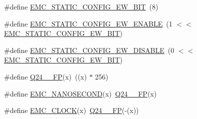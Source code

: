 \begin{DoxyCompactItemize}
\item 
\#define \hyperlink{group___e_m_c__18_x_x__43_x_x_ga370c463c17112a5a74f226c55c94f9b4}{E\+M\+C\+\_\+\+S\+T\+A\+T\+I\+C\+\_\+\+C\+O\+N\+F\+I\+G\+\_\+\+E\+W\+\_\+\+B\+IT}~(8)
\item 
\#define \hyperlink{group___e_m_c__18_x_x__43_x_x_ga91f57a23487235910d9a65c7e25c74e9}{E\+M\+C\+\_\+\+S\+T\+A\+T\+I\+C\+\_\+\+C\+O\+N\+F\+I\+G\+\_\+\+E\+W\+\_\+\+E\+N\+A\+B\+LE}~(1 $<$$<$ \hyperlink{group___e_m_c__18_x_x__43_x_x_ga370c463c17112a5a74f226c55c94f9b4}{E\+M\+C\+\_\+\+S\+T\+A\+T\+I\+C\+\_\+\+C\+O\+N\+F\+I\+G\+\_\+\+E\+W\+\_\+\+B\+IT})
\item 
\#define \hyperlink{group___e_m_c__18_x_x__43_x_x_gabacda615b3bbd01b7a4dba8a63434336}{E\+M\+C\+\_\+\+S\+T\+A\+T\+I\+C\+\_\+\+C\+O\+N\+F\+I\+G\+\_\+\+E\+W\+\_\+\+D\+I\+S\+A\+B\+LE}~(0 $<$$<$ \hyperlink{group___e_m_c__18_x_x__43_x_x_ga370c463c17112a5a74f226c55c94f9b4}{E\+M\+C\+\_\+\+S\+T\+A\+T\+I\+C\+\_\+\+C\+O\+N\+F\+I\+G\+\_\+\+E\+W\+\_\+\+B\+IT})
\item 
\#define \hyperlink{group___e_m_c__18_x_x__43_x_x_ga4160030fc647b9e75d09518b5ff8b532}{Q24\+\_\+\_\+\+FP}(x)~((x) $\ast$ 256)
\item 
\#define \hyperlink{group___e_m_c__18_x_x__43_x_x_ga5f3c9e1004a7d1f292b2baa1e3721b27}{E\+M\+C\+\_\+\+N\+A\+N\+O\+S\+E\+C\+O\+ND}(x)~\hyperlink{group___e_m_c__18_x_x__43_x_x_ga4160030fc647b9e75d09518b5ff8b532}{Q24\+\_\+\_\+\+FP}(x)
\item 
\#define \hyperlink{group___e_m_c__18_x_x__43_x_x_gaed230d096cfe13fee4009bee032365c8}{E\+M\+C\+\_\+\+C\+L\+O\+CK}(x)~\hyperlink{group___e_m_c__18_x_x__43_x_x_ga4160030fc647b9e75d09518b5ff8b532}{Q24\+\_\+\_\+\+FP}(-\/(x))
\end{DoxyCompactItemize}
